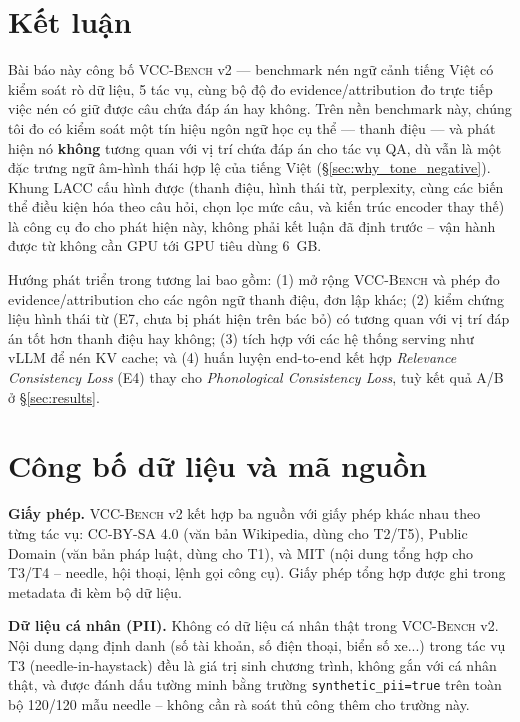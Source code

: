 \documentclass[12pt,a4paper]{article}
\newcommand{\method}[1]{\textsc{#1}}         %
\begin{document}
\section{Kết luận}

Bài báo này công bố \method{VCC-Bench} v2 --- benchmark nén ngữ cảnh tiếng Việt có kiểm soát rò dữ liệu, 5 tác vụ, cùng bộ độ đo evidence/attribution đo trực tiếp việc nén có giữ được câu chứa đáp án hay không. Trên nền benchmark này, chúng tôi đo có kiểm soát một tín hiệu ngôn ngữ học cụ thể --- thanh điệu --- và phát hiện nó \textbf{không} tương quan với vị trí chứa đáp án cho tác vụ QA, dù vẫn là một đặc trưng ngữ âm-hình thái hợp lệ của tiếng Việt (\S\ref{sec:why_tone_negative}). Khung \method{LACC} cấu hình được (thanh điệu, hình thái từ, perplexity, cùng các biến thể điều kiện hóa theo câu hỏi, chọn lọc mức câu, và kiến trúc encoder thay thế) là công cụ đo cho phát hiện này, không phải kết luận đã định trước -- vận hành được từ không cần GPU tới GPU tiêu dùng 6~GB.

Hướng phát triển trong tương lai bao gồm: (1) mở rộng \method{VCC-Bench} và phép đo evidence/attribution cho các ngôn ngữ thanh điệu, đơn lập khác; (2) kiểm chứng liệu hình thái từ (E7, chưa bị phát hiện trên bác bỏ) có tương quan với vị trí đáp án tốt hơn thanh điệu hay không; (3) tích hợp với các hệ thống serving như vLLM để nén KV cache; và (4) huấn luyện end-to-end kết hợp \textit{Relevance Consistency Loss} (E4) thay cho \textit{Phonological Consistency Loss}, tuỳ kết quả A/B ở \S\ref{sec:results}.


\section{Công bố dữ liệu và mã nguồn}

\textbf{Giấy phép.} \method{VCC-Bench} v2 kết hợp ba nguồn với giấy phép khác nhau theo từng tác vụ: CC-BY-SA 4.0 (văn bản Wikipedia, dùng cho T2/T5), Public Domain (văn bản pháp luật, dùng cho T1), và MIT (nội dung tổng hợp cho T3/T4 -- needle, hội thoại, lệnh gọi công cụ). Giấy phép tổng hợp được ghi trong metadata đi kèm bộ dữ liệu.

\textbf{Dữ liệu cá nhân (PII).} Không có dữ liệu cá nhân thật trong \method{VCC-Bench} v2. Nội dung dạng định danh (số tài khoản, số điện thoại, biển số xe...) trong tác vụ T3 (needle-in-haystack) đều là giá trị sinh chương trình, không gắn với cá nhân thật, và được đánh dấu tường minh bằng trường \texttt{synthetic\_pii=true} trên toàn bộ 120/120 mẫu needle -- không cần rà soát thủ công thêm cho trường này.
\end{document}
